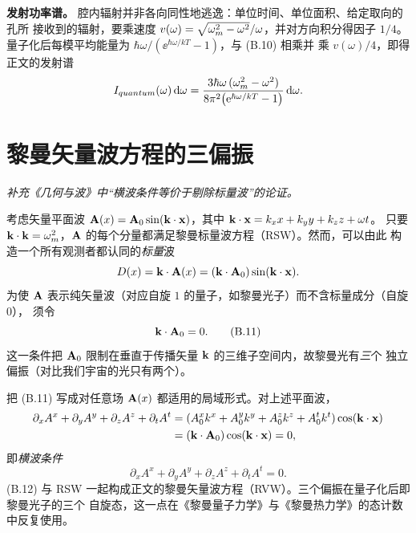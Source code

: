 \textbf{发射功率谱。} 腔内辐射并非各向同性地逃逸：单位时间、单位面积、给定取向的孔所
接收到的辐射，要乘速度 $v(\omega)=\sqrt{\omega_m^{2}-\omega^{2}}/\omega$，并对方向积分得因子
$1/4$。量子化后每模平均能量为 $\hbar\omega/(\ee^{\hbar\omega/kT}-1)$，与 (B.10) 相乘并
乘 $v(\omega)/4$，即得正文的发射谱
\begin{equation}
I_{quantum}(\omega)\,\mathrm{d}\omega=\frac{3\hbar\omega\,(\omega_m^{2}-\omega^{2})}{8\pi^{2}\bigl(\mathrm{e}^{\hbar\omega/kT}-1\bigr)}\,\mathrm{d}\omega .
\end{equation}

\section{黎曼矢量波方程的三偏振}
\emph{补充《几何与波》中“横波条件等价于剔除标量波”的论证。}

考虑矢量平面波 $\mathbf{A}(x)=\mathbf{A}_{0}\sin(\mathbf{k}\cdot\mathbf{x})$，其中 $\mathbf{k}\cdot\mathbf{x}=k_x x+k_y y+k_z z+\omega t$。
只要 $\mathbf{k}\cdot\mathbf{k}=\omega_m^{2}$，$\mathbf{A}$ 的每个分量都满足黎曼标量波方程（RSW）。然而，可以由此
构造一个所有观测者都认同的\emph{标量}波
\begin{equation}
D(x)=\mathbf{k}\cdot\mathbf{A}(x)=(\mathbf{k}\cdot\mathbf{A}_{0})\sin(\mathbf{k}\cdot\mathbf{x}).
\end{equation}
为使 $\mathbf{A}$ 表示纯矢量波（对应自旋 $1$ 的量子，如黎曼光子）而不含标量成分（自旋 $0$），
须令
\begin{equation}
\mathbf{k}\cdot\mathbf{A}_{0}=0 .
\tag{B.11}
\end{equation}
这一条件把 $\mathbf{A}_{0}$ 限制在垂直于传播矢量 $\mathbf{k}$ 的三维子空间内，故黎曼光有\emph{三}个
独立偏振（对比我们宇宙的光只有两个）。

把 (B.11) 写成对任意场 $\mathbf{A}(x)$ 都适用的局域形式。对上述平面波，
\begin{align}
\partial_{x}A^{x}+\partial_{y}A^{y}+\partial_{z}A^{z}+\partial_{t}A^{t}
&=(A_{0}^{x}k^{x}+A_{0}^{y}k^{y}+A_{0}^{z}k^{z}+A_{0}^{t}k^{t})\cos(\mathbf{k}\cdot\mathbf{x})\nonumber\\
&=(\mathbf{k}\cdot\mathbf{A}_{0})\cos(\mathbf{k}\cdot\mathbf{x})=0,
\end{align}
即\emph{横波条件}
\begin{equation}
\partial_{x}A^{x}+\partial_{y}A^{y}+\partial_{z}A^{z}+\partial_{t}A^{t}=0 .
\tag{B.12}
\end{equation}
(B.12) 与 RSW 一起构成正文的黎曼矢量波方程（RVW）。三个偏振在量子化后即黎曼光子的三个
自旋态，这一点在《黎曼量子力学》与《黎曼热力学》的态计数中反复使用。
